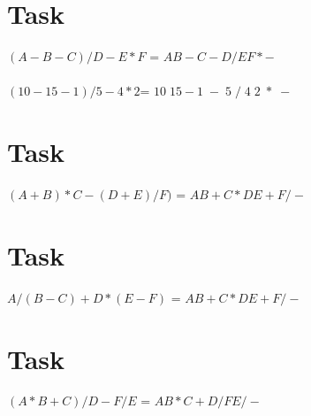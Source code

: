 \documentclass{article}
\begin{document}
	\large
	\section{Task}
	\noindent $(A-B-C)/D-E*F$ \hspace{1cm}=\hspace{1cm}  $AB-C-D/EF*-$ \\\\
	$(10-15-1)/5-4*2$\hspace{1.5cm}=\hspace{1cm} $10\;15 - 1\;-\;5\;/\;4\;2\; *\; -$\\
	\section{Task}
	\noindent$(A+B)*C-(D+E)/F)$ \hspace{0.6cm}=\hspace{1cm} $AB+C*DE+F/-$
	\section{Task}
	\noindent$A/(B-C)+D*(E-F)$ \hspace{0.8cm}=\hspace{1cm} $AB+C*DE+F/-$
	\section{Task}
	\noindent$(A*B+C)/D-F/E$ \hspace{1.5cm}=\hspace{1cm} $AB*C+D/FE/-$
	
\end{document}
